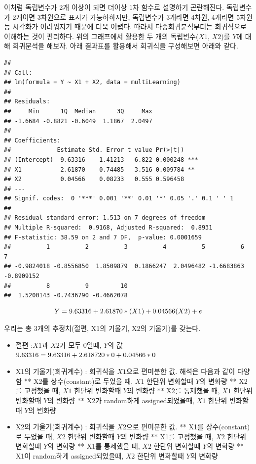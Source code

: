 \documentclass[
]{book}
\begin{document}
이처럼 독립변수가 2개 이상이 되면 더이상 1차 함수로 설명하기 곤란해진다. 독립변수가 2개이면 3차원으로 표시가 가능하하지만, 독립변수가 3개라면 4차원, 4개라면 5차원 등 시각화가 어려워지기 때문에 더욱 어렵다. 따라서 다중회귀분석부터는 회귀식으로 이해하는 것이 편리하다.
위의 그래프에서 활용한 두 개의 독립변수(\(X1\), \(X2\))를 \(Y\)에 대해 회귀분석을 해보자. 아래 결과표를 활용해서 회귀식을 구성해보면 아래와 같다.

\begin{verbatim}
## 
## Call:
## lm(formula = Y ~ X1 + X2, data = multiLearning)
## 
## Residuals:
##     Min      1Q  Median      3Q     Max 
## -1.6684 -0.8821 -0.6049  1.1867  2.0497 
## 
## Coefficients:
##             Estimate Std. Error t value Pr(>|t|)    
## (Intercept)  9.63316    1.41213   6.822 0.000248 ***
## X1           2.61870    0.74485   3.516 0.009784 ** 
## X2           0.04566    0.08233   0.555 0.596458    
## ---
## Signif. codes:  0 '***' 0.001 '**' 0.01 '*' 0.05 '.' 0.1 ' ' 1
## 
## Residual standard error: 1.513 on 7 degrees of freedom
## Multiple R-squared:  0.9168, Adjusted R-squared:  0.8931 
## F-statistic: 38.59 on 2 and 7 DF,  p-value: 0.0001659
##          1          2          3          4          5          6          7 
## -0.9824018 -0.8556850  1.8509879  0.1866247  2.0496482 -1.6683863 -0.8909152 
##          8          9         10 
##  1.5200143 -0.7436790 -0.4662078
\end{verbatim}

\[\small Y=9.63316+2.61870*(X1)+0.04566(X2)+e\]

우리는 총 3개의 추정치(절편, X1의 기울기, X2의 기울기)를 갖는다.

\begin{itemize}
\item
  절편 :\(X1\)과 \(X2\)가 모두 0일때, \(Y\)의 값
  \(\small 9.63316=9.63316+2.618720*0 + 0.04566*0\)
\item
  X1의 기울기(회귀계수) : 회귀식을 \(X1\)으로 편미분한 값. 해석은 다음과 같이 다양함
  ** X2를 상수(constant)로 두었을 때, \(X1\) 한단위 변화할때 \(Y\)의 변화량
  ** X2를 고정했을 때, \(X1\) 한단위 변화할때 \(Y\)의 변화량
  ** X2를 통제했을 때, \(X1\) 한단위 변화할때 \(Y\)의 변화량
  ** X2가 random하게 assigned되었을때, \(X1\) 한단위 변화할때 \(Y\)의 변화량
\item
  X2의 기울기(회귀계수) : 회귀식을 \(X2\)으로 편미분한 값.
  ** X1를 상수(constant)로 두었을 때, \(X2\) 한단위 변화할때 \(Y\)의 변화량
  ** X1를 고정했을 때, \(X2\) 한단위 변화할때 \(Y\)의 변화량
  ** X1를 통제했을 때, \(X2\) 한단위 변화할때 \(Y\)의 변화량
  ** X1이 random하게 assigned되었을때, \(X2\) 한단위 변화할때 \(Y\)의 변화량
\end{itemize}
\end{document}
